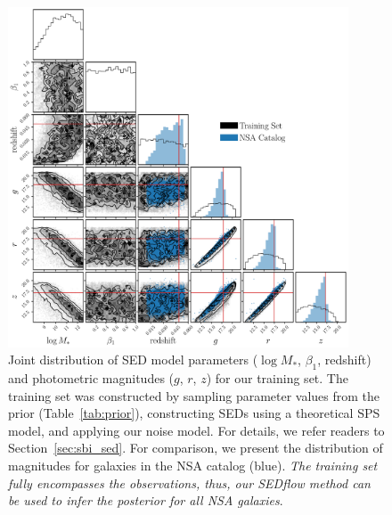 \begin{figure}
\begin{center}
\includegraphics[width=0.9\textwidth]{figs/training.pdf}
    \caption{\label{fig:data}
    Joint distribution of SED model parameters ($\log M_*$, $\beta_1$,
    redshift) and photometric magnitudes ($g$, $r$, $z$) for our training set.
    The training set was constructed by sampling parameter values from the
    prior (Table~\ref{tab:prior}), constructing SEDs using a theoretical SPS
    model, and applying our noise model. 
    For details, we refer readers to Section~\ref{sec:sbi_sed}.
    For comparison, we present the distribution of magnitudes for galaxies in
    the NSA catalog (blue). 
    \emph{The training set fully encompasses the observations, thus, our 
    {\sc SEDflow} method can be used to infer the posterior for all NSA
    galaxies}.
    }
\end{center}
\end{figure}
